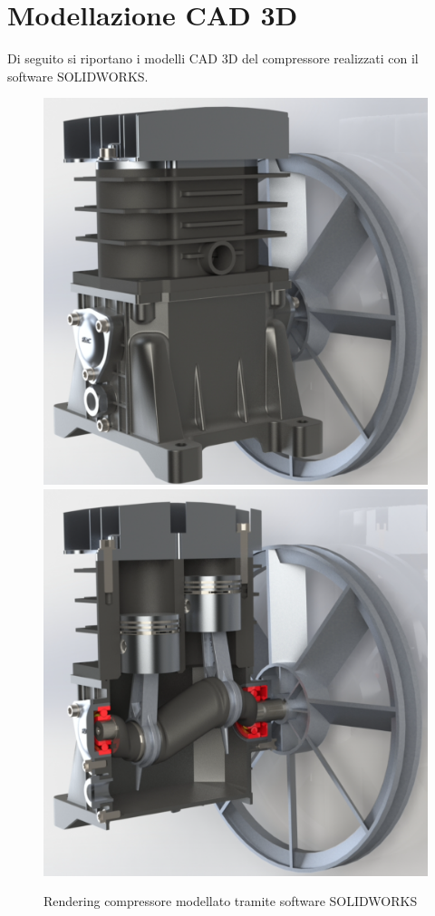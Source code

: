 \section{Modellazione CAD 3D}
Di seguito si riportano i modelli CAD 3D del compressore realizzati con il software SOLIDWORKS.
\begin{figure}[h]
    \centering
    \includegraphics[scale=0.3]{Immagini/RenderingCompressore1.png}
    \includegraphics[scale=0.3]{Immagini/RenderingCompressore2.png}
    \caption{Rendering compressore modellato tramite software SOLIDWORKS}
    \label{fig:rendering12}
\end{figure}
